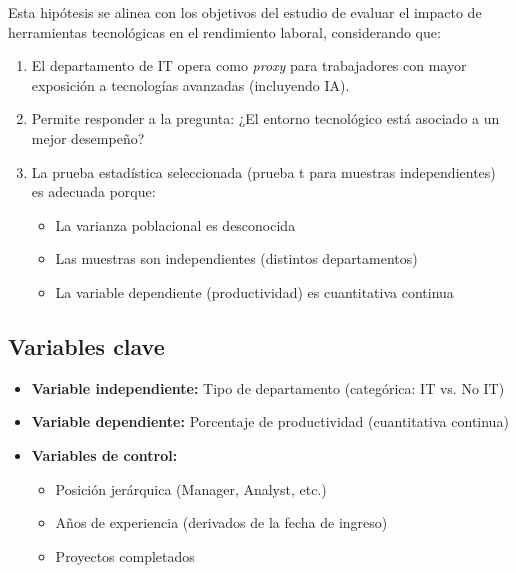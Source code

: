   Esta hipótesis se alinea con los objetivos del estudio de evaluar el impacto de herramientas tecnológicas en el rendimiento laboral, considerando que:
  \begin{enumerate}
    \item El departamento de IT opera como \textit{proxy} para trabajadores con mayor exposición a tecnologías avanzadas (incluyendo IA).
    \item Permite responder a la pregunta: ¿El entorno tecnológico está asociado a un mejor desempeño?
    \item La prueba estadística seleccionada (prueba t para muestras independientes) es adecuada porque:
      \begin{itemize}
        \item La varianza poblacional es desconocida
        \item Las muestras son independientes (distintos departamentos)
        \item La variable dependiente (productividad) es cuantitativa continua
      \end{itemize}
  \end{enumerate}

  \subsection*{Variables clave}
  \begin{itemize}
    \item \textbf{Variable independiente:} Tipo de departamento (categórica: IT vs. No IT)
    \item \textbf{Variable dependiente:} Porcentaje de productividad (cuantitativa continua)
    \item \textbf{Variables de control:} 
      \begin{itemize}
        \item Posición jerárquica (Manager, Analyst, etc.)
        \item Años de experiencia (derivados de la fecha de ingreso)
        \item Proyectos completados
      \end{itemize}
  \end{itemize}